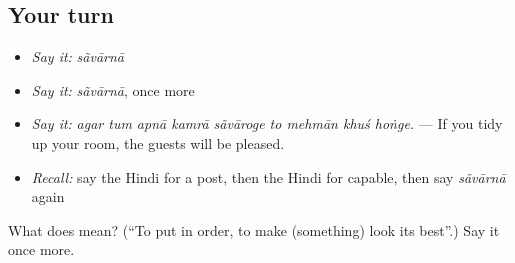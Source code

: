 \subsection*{Your turn}
\begin{itemize}
\raggedright
  \item \emph{Say it:} \emph{sãvārnā}
  \item \emph{Say it:} \emph{sãvārnā}, once more
  \item \emph{Say it:} \emph{agar tum apnā kamrā sãvāroge to mehmān khuś hoṅge.} — If you tidy up your room, the guests will be pleased.
  \item \emph{Recall:} say the Hindi for a post, then the Hindi for capable, then say \emph{sãvārnā} again
\end{itemize}

\begin{tcolorbox}[breakable,colback=teal!4,colframe=teal!35!black,title={Before you move on}]
What does  mean? (\textquotedblleft{}To put in order, to make (something) look its best\textquotedblright{}.) Say it once more.
\end{tcolorbox}
